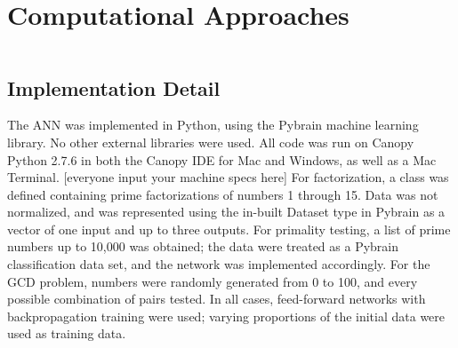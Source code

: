 \documentclass[11pt]{article}
\begin{document}
\section{Computational Approaches}$ $
\subsection{Implementation Detail}
The ANN was implemented in Python, using the Pybrain machine learning library. No other external libraries were used. All code was run on Canopy Python 2.7.6 in both the Canopy IDE for Mac and Windows, as well as a Mac Terminal. [everyone input your machine specs here]
\indent
For factorization, a class was defined containing prime factorizations of numbers 1 through 15. Data was not normalized, and was represented using the in-built Dataset type in Pybrain as a vector of one input and up to three outputs. For primality testing, a list of prime numbers up to 10,000 was obtained; the data were treated as a Pybrain classification data set, and the network was implemented accordingly. For the GCD problem, numbers were randomly generated from 0 to 100, and every possible combination of pairs tested. In all cases, feed-forward networks with backpropagation training were used; varying proportions of the initial data were used as training data.
\end{document}

